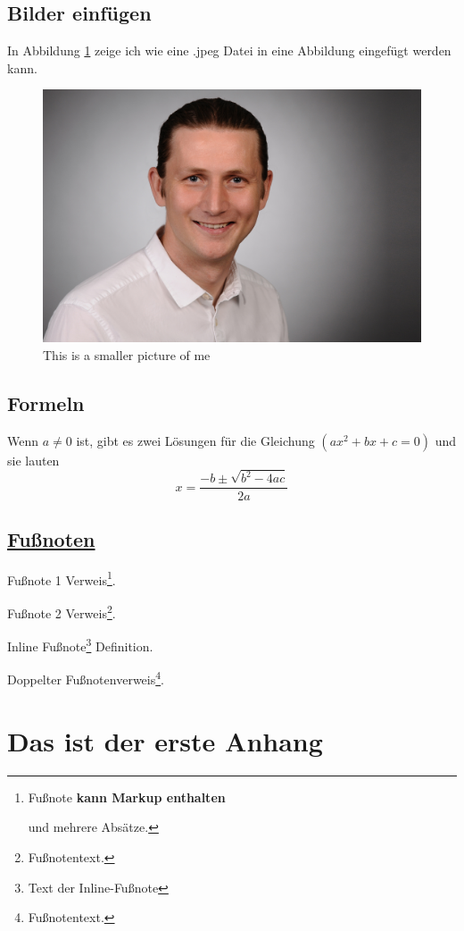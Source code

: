 \documentclass[
  doc]{apa7}
\begin{document}
\hypertarget{bilder-einfuxfcgen}{%
\subsection{Bilder einfügen}\label{bilder-einfuxfcgen}}

In Abbildung \ref{fig:figofme} zeige ich wie eine .jpeg Datei in eine Abbildung eingefügt werden kann.

\begin{figure}

{\centering \includegraphics[width=0.2\linewidth]{temp} 

}

\caption{This is a smaller picture of me}\label{fig:figofme}
\end{figure}

\hypertarget{formeln}{%
\subsection{Formeln}\label{formeln}}

Wenn \(a \ne 0\) ist, gibt es zwei Lösungen für die Gleichung \((ax^2 + bx + c = 0)\) und sie lauten
\[ x = \frac{-b \pm \sqrt{b^2-4ac}}{2a} \]

\hypertarget{fuuxdfnoten}{%
\subsection{\texorpdfstring{\href{https://github.com/markdown-it/markdown-it-footnote}{Fußnoten}}{Fußnoten}}\label{fuuxdfnoten}}

Fußnote 1 Verweis\footnote{Fußnote \textbf{kann Markup enthalten}

  und mehrere Absätze.}.

Fußnote 2 Verweis\footnote{Fußnotentext.}.

Inline Fußnote\footnote{Text der Inline-Fußnote} Definition.

Doppelter Fußnotenverweis\footnote{Fußnotentext.}.

\printbibliography

\newpage

\hypertarget{appendix-appendix}{%
\appendix}


\hypertarget{das-ist-der-erste-anhang}{%
\section{Das ist der erste Anhang}\label{das-ist-der-erste-anhang}}
\end{document}
